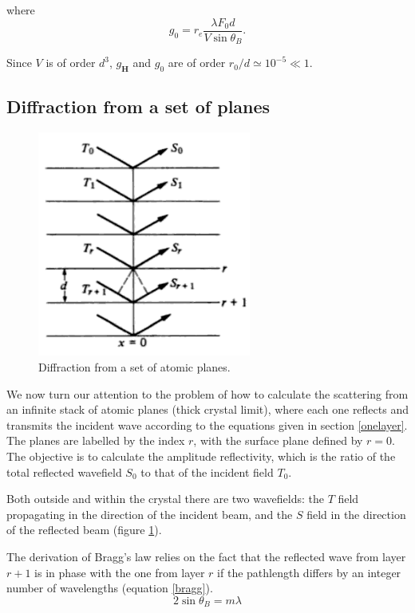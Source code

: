 \documentclass[12pt,oneside,notitlepage,abstracton,a4paper]{scrartcl}
\begin{document}
where
\begin{equation} \label{eqg0}
 g_0=r_e\frac{\lambda F_0 d}{V \sin{\theta_B}}.
\end{equation}

Since $V$ is of order $d^3$, $g_\mathbf{H}$ and $g_0$ are of order $r_0/d \simeq 10^{-5} \ll 1$.

\newpage
\subsection{Diffraction from a set of planes}
\begin{figure}
\vspace{-40pt}
\begin{center}
\includegraphics[width=7cm]{pics/picture3.png}
\caption{Diffraction from a set of atomic planes.}
\label{pic3}
\end{center}
\end{figure}We now turn our attention to the problem of how to calculate the scattering from an infinite stack of atomic planes (thick crystal limit), where each one reflects and transmits the incident wave according to the equations given in section \ref{onelayer}. The planes are labelled by the index $r$, with the surface plane defined by $r=0$. The objective is to calculate the amplitude reflectivity, which is the ratio of the total reflected wavefield $S_0$ to that of the incident field $T_0$.

Both outside and within the crystal there are two wavefields: the $T$ field propagating in the direction of the incident beam, and the $S$ field in the direction of the reflected beam (figure \ref{pic3}).




The derivation of Bragg's law relies on the fact that the reflected wave from layer $r+1$ is in phase with the one from layer $r$ if the pathlength differs by an integer number of wavelengths (equation \ref{bragg}). 
\begin{equation}\label{bragg}
 2\sin{\theta_B}=m\lambda
\end{equation}
\end{document}
